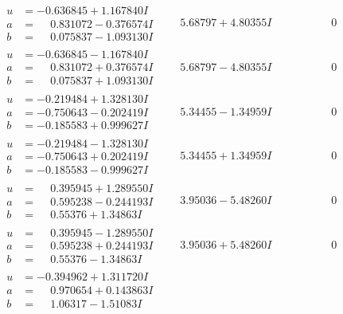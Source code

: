 \documentclass[1p]{elsarticle_modified}
\theoremstyle{definition}
\begin{document}
$$\begin{array}{c|c|c}
\begin{aligned}
u &= -0.636845 + 1.167840 I \\
a &= \phantom{-}0.831072 - 0.376574 I \\
b &= \phantom{-}0.075837 - 1.093130 I\end{aligned}
 & \phantom{-}5.68797 + 4.80355 I & \phantom{-0.000000 } 0 \\ \hline\begin{aligned}
u &= -0.636845 - 1.167840 I \\
a &= \phantom{-}0.831072 + 0.376574 I \\
b &= \phantom{-}0.075837 + 1.093130 I\end{aligned}
 & \phantom{-}5.68797 - 4.80355 I & \phantom{-0.000000 } 0 \\ \hline\begin{aligned}
u &= -0.219484 + 1.328130 I \\
a &= -0.750643 - 0.202419 I \\
b &= -0.185583 + 0.999627 I\end{aligned}
 & \phantom{-}5.34455 - 1.34959 I & \phantom{-0.000000 } 0 \\ \hline\begin{aligned}
u &= -0.219484 - 1.328130 I \\
a &= -0.750643 + 0.202419 I \\
b &= -0.185583 - 0.999627 I\end{aligned}
 & \phantom{-}5.34455 + 1.34959 I & \phantom{-0.000000 } 0 \\ \hline\begin{aligned}
u &= \phantom{-}0.395945 + 1.289550 I \\
a &= \phantom{-}0.595238 - 0.244193 I \\
b &= \phantom{-}0.55376 + 1.34863 I\end{aligned}
 & \phantom{-}3.95036 - 5.48260 I & \phantom{-0.000000 } 0 \\ \hline\begin{aligned}
u &= \phantom{-}0.395945 - 1.289550 I \\
a &= \phantom{-}0.595238 + 0.244193 I \\
b &= \phantom{-}0.55376 - 1.34863 I\end{aligned}
 & \phantom{-}3.95036 + 5.48260 I & \phantom{-0.000000 } 0 \\ \hline\begin{aligned}
u &= -0.394962 + 1.311720 I \\
a &= \phantom{-}0.970654 + 0.143863 I \\
b &= \phantom{-}1.06317 - 1.51083 I\end{aligned}

\end{array}$$
\end{document}
